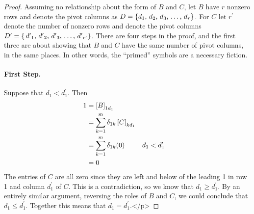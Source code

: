 \documentclass{ximera}
\begin{document}
\begin{theorem}
\begin{proof}
Assuming no relationship about the form of $B$ and $C$, let $B$ have $r$ nonzero rows and denote the pivot columns as $D=\left\{{d}_{1},\,{d}_{2},\,{d}_{3},\,\ldots,\,{d}_{r}\right\}$.  For $C$ let $r^\prime$ denote the number of nonzero rows and denote the pivot columns $D^\prime=\left\{\,{d^\prime}_{1},\,{d^\prime}_{2},\,{d^\prime}_{3},\,\ldots,\,{d^\prime}_{r^\prime}\right\}$.  There are four steps in the proof, and the first three are about showing that $B$ and $C$ have the same number of pivot columns, in the same places.  In other words, the ``primed'' symbols are a necessary fiction.

\paragraph*{First Step.}  Suppose that $d_1 < d^\prime_1$.  Then
\begin{align*}
1
&=\left\lbrack B\right\rbrack_{1d_1}
\\
&=\sum_{k=1}^{m}\delta_{1k}\left\lbrack C\right\rbrack_{kd_1}\\
&=\sum_{k=1}^{m}\delta_{1k}(0)
&&d_1<d^\prime_1\\
&=0
\end{align*}
The entries of $C$ are all zero since they are left and below of the leading 1 in row 1 and column $d^\prime_1$ of $C$.  This is a contradiction, so we know that $d_1\geq d^\prime_1$.  By an entirely similar argument, reversing the roles of $B$ and $C$, we could conclude that $d_1\leq d^\prime_1$.  Together this means that $d_1=d^\prime_1$.</p>


\end{proof}
\end{theorem}
\end{document}
